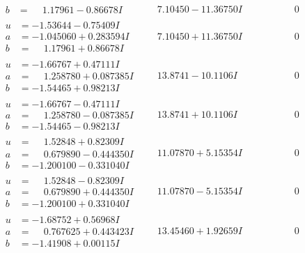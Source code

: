 \documentclass[1p]{elsarticle_modified}
\theoremstyle{definition}
\begin{document}
$$\begin{array}{c|c|c}
\begin{aligned}
b &= \phantom{-}1.17961 - 0.86678 I\end{aligned}
 & \phantom{-}7.10450 - 11.36750 I & \phantom{-0.000000 } 0 \\ \hline\begin{aligned}
u &= -1.53644 - 0.75409 I \\
a &= -1.045060 + 0.283594 I \\
b &= \phantom{-}1.17961 + 0.86678 I\end{aligned}
 & \phantom{-}7.10450 + 11.36750 I & \phantom{-0.000000 } 0 \\ \hline\begin{aligned}
u &= -1.66767 + 0.47111 I \\
a &= \phantom{-}1.258780 + 0.087385 I \\
b &= -1.54465 + 0.98213 I\end{aligned}
 & \phantom{-}13.8741 - 10.1106 I & \phantom{-0.000000 } 0 \\ \hline\begin{aligned}
u &= -1.66767 - 0.47111 I \\
a &= \phantom{-}1.258780 - 0.087385 I \\
b &= -1.54465 - 0.98213 I\end{aligned}
 & \phantom{-}13.8741 + 10.1106 I & \phantom{-0.000000 } 0 \\ \hline\begin{aligned}
u &= \phantom{-}1.52848 + 0.82309 I \\
a &= \phantom{-}0.679890 - 0.444350 I \\
b &= -1.200100 - 0.331040 I\end{aligned}
 & \phantom{-}11.07870 + 5.15354 I & \phantom{-0.000000 } 0 \\ \hline\begin{aligned}
u &= \phantom{-}1.52848 - 0.82309 I \\
a &= \phantom{-}0.679890 + 0.444350 I \\
b &= -1.200100 + 0.331040 I\end{aligned}
 & \phantom{-}11.07870 - 5.15354 I & \phantom{-0.000000 } 0 \\ \hline\begin{aligned}
u &= -1.68752 + 0.56968 I \\
a &= \phantom{-}0.767625 + 0.443423 I \\
b &= -1.41908 + 0.00115 I\end{aligned}
 & \phantom{-}13.45460 + 1.92659 I & \phantom{-0.000000 } 0 \\ \hline\begin{aligned}

\end{aligned}
\end{array}$$
\end{document}
